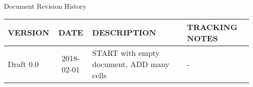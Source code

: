 Document Revision History
\begin{table}[h] %
    \begin{tabular}{|l|c|ll|} \hline
        VERSION & DATE & DESCRIPTION & TRACKING NOTES\\ \hline\hline
        Draft 0.0 & 2018-02-01 & START with empty document, ADD many cells & -\\ \hline
    \end{tabular}
\end{table}


